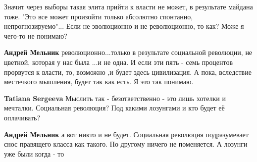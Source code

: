 \begin{itemize}
 

Значит через выборы такая элита прийти к власти не может, в результате майдана
тоже. "Это все может произойти только абсолютно спонтанно, непрогнозируемо"...
Если не эволюционно и не революционно, то как? Може я чего-то не понимаю?

\begin{itemize}
 
\textbf{Андрей Мельник} революционно...только в результате социальной революции, не цветной, которая у нас была ...и не одна.
И если эти пять - семь процентов прорвутся к власти, то, возможно ,и будет здесь цивилизация. А пока, вследствие местечкого мышления, будет так как есть. Я это так понимаю.

 
\textbf{Tatiana Sergeeva} Мыслить так - безответственно - это лишь хотелки и мечталки. Социальная революция? Под какими лозунгами и кто будет её оплачивать?

 
\textbf{Андрей Мельник} а вот никто и не будет. Социальная революция подразумевает снос правящего класса как такого. По другому ничего не поменяется.
А лозунги уже были когда - то

 

\end{itemize}
\end{itemize}

